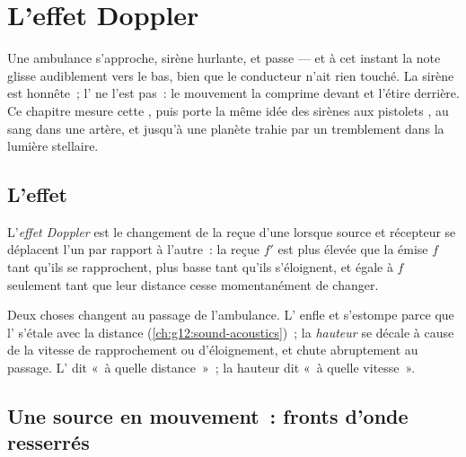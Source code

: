 \chapter{L'effet Doppler}\label{ch:g12:doppler-effect}

Une ambulance s'approche, sirène hurlante, et passe --- et à cet
instant la note glisse audiblement vers le bas, bien que le conducteur
n'ait rien touché. La sirène est honnête~; l' ne l'est pas~: le
mouvement la comprime devant et l'étire derrière. Ce chapitre mesure
cette , puis porte la même idée des sirènes aux pistolets
, au sang dans une artère, et jusqu'à une planète trahie par
un tremblement dans la lumière stellaire.

\section{L'effet}

\begin{definition}\label{def:g12:doppler-effect:doppler}
L'\emph{effet Doppler} est le changement de la
 reçue d'une  lorsque source et
récepteur se déplacent l'un par rapport à l'autre~: la
 reçue $f'$ est plus élevée que la
 émise $f$ tant qu'ils se rapprochent, plus basse
tant qu'ils s'éloignent, et égale à $f$ seulement tant que leur
distance cesse momentanément de changer.
\end{definition}

\begin{remark}\label{rem:g12:doppler-effect:pitch}
Deux choses changent au passage de l'ambulance. L'\emph{}
enfle et s'estompe parce que l' s'étale avec la distance
(\cref{ch:g12:sound-acoustics})~; la \emph{hauteur} se décale
à cause de la vitesse de rapprochement ou d'éloignement, et chute
abruptement au passage. L' dit «~à quelle
distance~»~; la hauteur dit «~à quelle vitesse~».
\end{remark}

\section{Une source en mouvement~: fronts d'onde resserrés}

